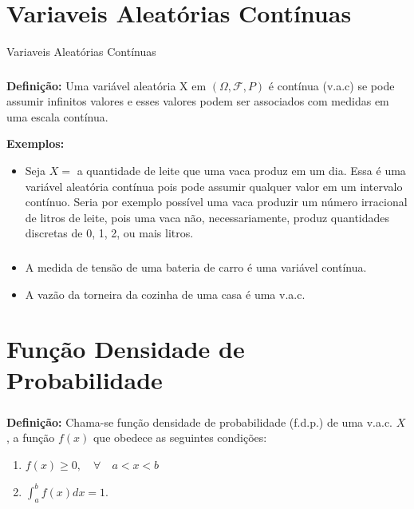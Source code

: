 \documentclass[14pt,aspectratio=1610]{beamer}
\begin{document}
\section{Variaveis Aleatórias Contínuas}
\begin{frame}{Variaveis Aleatórias Contínuas}
\frametitle{}
\begin{block}{}
\justifying
\textbf{Definição:} Uma variável aleatória X em $(\Omega, \mathcal{F},P)$ é contínua (v.a.c) se pode assumir infinitos valores e esses valores podem ser associados 
com medidas em uma escala contínua.\pause

\textbf{Exemplos:}

\begin{itemize}
\item Seja $X=$ a quantidade de leite que uma vaca produz em um dia. Essa é uma variável aleatória contínua pois pode assumir qualquer valor em um intervalo contínuo. 
Seria por exemplo possível uma vaca produzir um número irracional de litros de leite, pois uma vaca não, necessariamente, produz quantidades discretas de 0, 1, 2, ou 
mais litros.\pause
\end{itemize}
\end{block}
\end{frame}

\begin{frame}{}
\frametitle{}
\begin{block}{}
\justifying
\begin{itemize}
\item A medida de tensão de uma bateria de carro é uma variável contínua.\pause
\item A vazão da torneira da cozinha de uma casa é uma v.a.c.
\end{itemize}
\end{block}
\end{frame}

\section{Função Densidade de Probabilidade}
\begin{frame}{}
\frametitle{}
\begin{block}{}
\textbf{Definição:} Chama-se função densidade de probabilidade (f.d.p.) de uma v.a.c. $X$, a função $f(x)$ que obedece as seguintes condições:

\begin{enumerate}
\item $f(x)\geq 0,\quad \forall \quad a<x<b$
\item $\displaystyle \int_{a}^{b}f(x)dx=1$.
\end{enumerate}
\end{block}
\end{frame}
\end{document}
